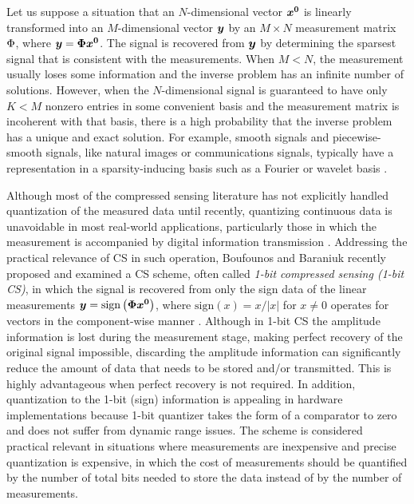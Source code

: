 \documentclass[12pt]{iopart}
\begin{document}
Let us suppose a situation that an $N$-dimensional vector $\textrm{\boldmath $x^{0}$}$ is linearly transformed into an $M$-dimensional vector $\textrm{\boldmath $y$}$ by an $M \times N$ measurement matrix $\boldmath \Phi$, where $\textrm{\boldmath $y$}=\textrm{\boldmath $\Phi x^{0}$}$. The signal is recovered from $\textrm{\boldmath $y$}$ by determining the sparsest signal that is consistent with the measurements. When $M < N$, the measurement usually loses some information and the inverse problem has an infinite number of solutions. However, when the $N$-dimensional signal is guaranteed to have only $K<M$ nonzero entries in some convenient basis and the measurement matrix is {incoherent} with that basis, there is a high probability that the inverse problem has a unique and exact solution. For example, smooth signals and piecewise-smooth signals, like natural images or communications signals, typically have a representation in a sparsity-inducing basis such as a Fourier or wavelet basis \cite{Elad2010,StarckMurtaghFadili2010}. 

Although most of the compressed sensing literature has not explicitly handled quantization of the measured data until recently, quantizing continuous data is unavoidable in most real-world applications, particularly those in which the measurement is accompanied by digital information transmission \cite{Lee2012}. Addressing the practical relevance of CS in such operation, Boufounos and Baraniuk recently proposed and examined a CS scheme, often called {\em 1-bit compressed sensing (1-bit CS)}, in which the signal is recovered from only the sign data of the linear measurements $\textrm{\boldmath $y$}=\mathrm{sign}\left(\textrm{\boldmath $\Phi x^{0}$}\right)$, where $\mathrm{sign}(x)=x/|x|$ for $x \ne 0$ operates for vectors in the component-wise manner \cite{1bitCS}. Although in 1-bit CS the amplitude information is lost during the measurement stage, making perfect recovery of the original signal impossible, discarding the amplitude information can significantly reduce the amount of data that needs to be stored and/or transmitted. This is highly advantageous when perfect recovery is not required. In addition, quantization to the 1-bit (sign) information is appealing in hardware implementations because 1-bit quantizer takes the form of a comparator to zero and does not suffer from dynamic range issues. The scheme is considered practical relevant in situations where measurements are inexpensive and precise quantization is expensive, in which the cost of measurements should be quantified by the number of total bits needed to store the data instead of by the number of measurements. 
\end{document}
